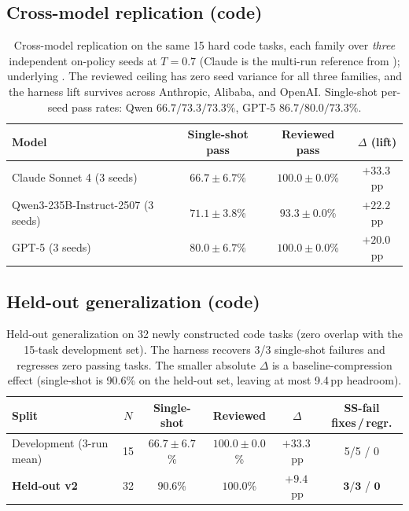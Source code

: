 \subsection{Cross-model replication (code)}
\begin{table}[H]
\centering
\caption{Cross-model replication on the same 15 hard code tasks, each family over \emph{three} independent on-policy seeds at $T{=}0.7$ (Claude is the multi-run reference from ); underlying . The reviewed ceiling has zero seed variance for all three families, and the harness lift survives across Anthropic, Alibaba, and OpenAI. Single-shot per-seed pass rates: Qwen $66.7/73.3/73.3\%$, GPT-5 $86.7/80.0/73.3\%$.}
\label{tab:crossmodel}
\small
\begin{tabular}{lccc}
\toprule
Model & Single-shot pass & Reviewed pass & $\Delta$ (lift) \\
\midrule
Claude Sonnet 4 (3 seeds)            & $66.7 \pm 6.7$\%   & $\mathbf{100.0 \pm 0.0}$\%      & $\mathbf{+33.3}$\,pp \\
Qwen3-235B-Instruct-2507 (3 seeds)   & $71.1 \pm 3.8$\%   & $\mathbf{93.3 \pm 0.0}$\%       & $\mathbf{+22.2}$\,pp \\
GPT-5 (3 seeds)                      & $80.0 \pm 6.7$\%   & $\mathbf{100.0 \pm 0.0}$\%      & $\mathbf{+20.0}$\,pp \\
\bottomrule
\end{tabular}
\end{table}

\subsection{Held-out generalization (code)}
\begin{table}[H]
\centering
\caption{Held-out generalization on 32 newly constructed code tasks (zero overlap with the 15-task development set). The harness recovers 3/3 single-shot failures and regresses zero passing tasks. The smaller absolute $\Delta$ is a baseline-compression effect (single-shot is 90.6\% on the held-out set, leaving at most 9.4\,pp headroom).}
\label{tab:heldout}
\small
\begin{tabular}{lccccc}
\toprule
Split & $N$ & Single-shot & Reviewed & $\Delta$ & SS-fail fixes\,/\,regr. \\
\midrule
Development (3-run mean) & 15 & $66.7 \pm 6.7$\% & $100.0 \pm 0.0$\% & $+33.3$\,pp & 5/5 / 0 \\
\textbf{Held-out v2}     & 32 & $90.6$\% & $\mathbf{100.0}$\% & $\mathbf{+9.4}$\,pp & $\mathbf{3/3}$ / $\mathbf{0}$ \\
\bottomrule
\end{tabular}
\end{table}

